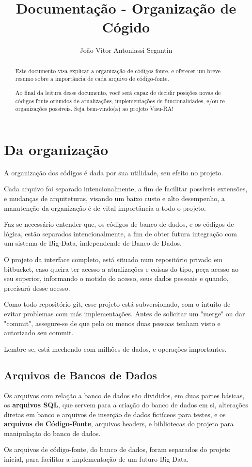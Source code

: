 \documentclass[onecolumn,12pt]{article}
\title{Documentação - Organização de Cógido}
\author{João Vitor Antoniassi Segantin}
\begin{document}
	\maketitle
	\begin{abstract}
		Este documento visa explicar a organização de códigos fonte, e oferecer um breve resumo sobre a importância de cada arquivo de código-fonte.\par
		Ao final da leitura desse documento, você será capaz de decidir posições novas de códigos-fonte oriundos de atualizações, implementações de funcionalidades, e/ou re-organizações possíveis.
		Seja bem-vindo(a) ao projeto Visu-RA!
	\end{abstract}
	\newpage
	\indent
	
    \section{Da organização}
    	A organização dos códigos é dada por sua utilidade, seu efeito no projeto.\par
    	Cada arquivo foi separado intencionalmente, a fim de facilitar possíveis extensões, e mudanças de arquiteturas, visando um baixo custo e alto desempenho, a manutenção da organização é de vital importância a todo o projeto. \par
    	Faz-se necessário entender que, os códigos de banco de dados, e os códigos de lógica, estão separados intencionalmente, a fim de obter futura integração com um sistema de Big-Data, independende de Banco de Dados.\par
    	O projeto da interface completo, está situado num repositório privado em bitbucket, caso queira ter acesso a atualizações e coisas do tipo, peça acesso ao seu superior, informando o motido do acesso, seus dados pessoais e quando, precisará desse acesso.\par
    	Como todo repositório git, esse projeto está subversionado, com o intuito de evitar problemas com más implementações. Antes de solicitar um "merge" ou dar "commit", assegure-se de que pelo ou menos duas pessoas tenham visto e autorizado seu commit.\par
    	Lembre-se, está mechendo com milhões de dados, e operações importantes.
    
    	\subsection{Arquivos de Bancos de Dados}
    		Os arquivos com relação a banco de dados são divididos, em duas partes básicas, os \textbf{arquivos SQL}, que servem para a criação do banco de dados em si, alterações diretas em banco e arquivos de inserção de dados fictíceos para testes, e os \textbf{arquivos de Código-Fonte}, arquivos headers, e bibliotecas do projeto para manipulação do banco de dados.\par
    		Os arquivos de código-fonte, do banco de dados, foram separados do projeto inicial, para facilitar a implementação de um futuro Big-Data.
\end{document}
